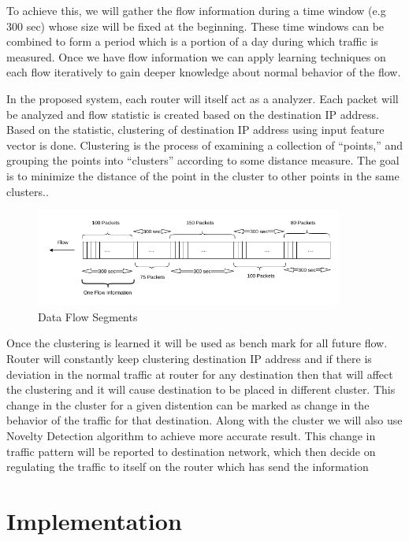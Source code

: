 \documentclass[10pt,oneside,a4paper]{article}
\begin{document}
To achieve this, we will gather the flow information during a time window (e.g 300 sec) whose size will be fixed at the beginning.
These time windows can be combined to form a period which is a portion of a day during which traffic is measured. Once we have flow information we can apply learning techniques on each flow iteratively to gain deeper knowledge about normal behavior of the flow.\par

In the proposed system, each router will itself act as a analyzer. Each packet will be analyzed and flow statistic is created based on the destination IP address. Based on the statistic, clustering of destination IP address using input feature vector is done. Clustering is the process of examining a collection of “points,” and grouping the points into “clusters” according to some distance measure. The goal is to minimize the distance of the point in the cluster to other points in the same clusters.\cite{machineLearning}.

\begin{figure}[H]
\centering
\includegraphics[width=0.90\textwidth]{Data_Flow_Capture}
\caption{Data Flow Segments} \label{fig:flow}
\end{figure}

Once the clustering is learned it will be used as bench mark for all future flow. Router will constantly keep clustering destination IP address and if there is deviation in the normal traffic at router for any destination then that will affect the clustering and it will cause destination to be placed in different cluster. This change in the cluster for a given distention can be marked as change in the behavior of the traffic for that destination. Along with the cluster we will also use Novelty Detection algorithm to achieve more accurate result. This change in traffic pattern will be reported to destination network, which then decide on regulating the traffic to itself on the router which has send the information\par

\section{Implementation}
\end{document}
